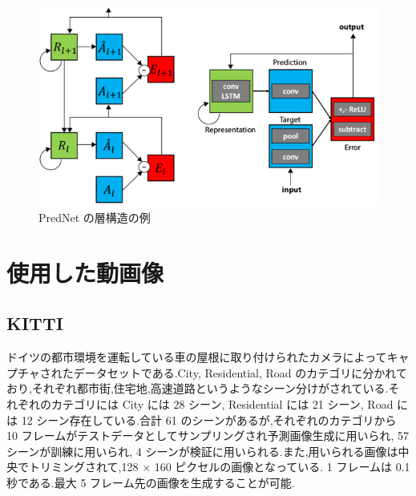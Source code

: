  \begin{figure}[hb]
\includegraphics[scale=0.4]{prednet.png}
 \caption{PredNet の層構造の例}
\end{figure}
\section{使用した動画像}
\subsection{KITTI}
ドイツの都市環境を運転している車の屋根に取り付けられたカメラによってキャプチャされたデータセットである.City, Residential, Road のカテゴリに分かれており,それぞれ都市街,住宅地,高速道路というようなシーン分けがされている.それぞれのカテゴリには City には 28 シーン, Residential には 21 シーン, Road には 12 シーン存在している.合計 61 のシーンがあるが,それぞれのカテゴリから 10 フレームがテストデータとしてサンプリングされ予測画像生成に用いられ, 57 シーンが訓練に用いられ, 4 シーンが検証に用いられる.また,用いられる画像は中央でトリミングされて,128 × 160 ピクセルの画像となっている. 1 フレームは 0.1 秒である.最大 5 フレーム先の画像を生成することが可能.


